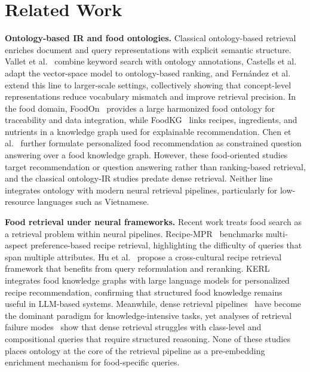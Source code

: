\section{Related Work}
\label{sec:related_work}

\textbf{Ontology-based IR and food ontologies.}
Classical ontology-based retrieval enriches document and query representations with explicit semantic structure. Vallet et al.~\cite{vallet2005ontology} combine keyword search with ontology annotations, Castells et al.~\cite{castells2007adaptation} adapt the vector-space model to ontology-based ranking, and Fern\'{a}ndez et al.~\cite{fernandez2011semantic} extend this line to larger-scale settings, collectively showing that concept-level representations reduce vocabulary mismatch and improve retrieval precision. In the food domain, FoodOn~\cite{dooley2018foodon} provides a large harmonized food ontology for traceability and data integration, while FoodKG~\cite{haussmann2019foodkg} links recipes, ingredients, and nutrients in a knowledge graph used for explainable recommendation. Chen et al.~\cite{chen2021personalized} further formulate personalized food recommendation as constrained question answering over a food knowledge graph. However, these food-oriented studies target recommendation or question answering rather than ranking-based retrieval, and the classical ontology-IR studies predate dense retrieval. Neither line integrates ontology with modern neural retrieval pipelines, particularly for low-resource languages such as Vietnamese.

\textbf{Food retrieval under neural frameworks.}
Recent work treats food search as a retrieval problem within neural pipelines. Recipe-MPR~\cite{zhang2023recipempr} benchmarks multi-aspect preference-based recipe retrieval, highlighting the difficulty of queries that span multiple attributes. Hu et al.~\cite{hu2024bridging} propose a cross-cultural recipe retrieval framework that benefits from query reformulation and reranking. KERL~\cite{mohbat2025kerl} integrates food knowledge graphs with large language models for personalized recipe recommendation, confirming that structured food knowledge remains useful in LLM-based systems. Meanwhile, dense retrieval pipelines~\cite{karpukhin2020dense, gao2023rag} have become the dominant paradigm for knowledge-intensive tasks, yet analyses of retrieval failure modes~\cite{barnett2024seven, edge2024local} show that dense retrieval struggles with class-level and compositional queries that require structured reasoning. None of these studies places ontology at the core of the retrieval pipeline as a pre-embedding enrichment mechanism for food-specific queries.

